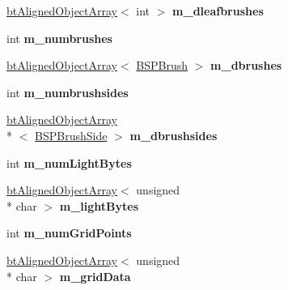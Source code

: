 \begin{DoxyCompactItemize}
\item 
\hypertarget{class_bsp_loader_a443ee94c636f62c62e08bb0eb2f2d7f6}{\hyperlink{classbt_aligned_object_array}{bt\+Aligned\+Object\+Array}$<$ int $>$ {\bfseries m\+\_\+dleafbrushes}}\label{class_bsp_loader_a443ee94c636f62c62e08bb0eb2f2d7f6}

\item 
\hypertarget{class_bsp_loader_a9164fbd68cb9bcd4e98ed4fd91d02ecd}{int {\bfseries m\+\_\+numbrushes}}\label{class_bsp_loader_a9164fbd68cb9bcd4e98ed4fd91d02ecd}

\item 
\hypertarget{class_bsp_loader_a6cfc73b3ff3eba7a197083198b4d998f}{\hyperlink{classbt_aligned_object_array}{bt\+Aligned\+Object\+Array}$<$ \hyperlink{struct_b_s_p_brush}{B\+S\+P\+Brush} $>$ {\bfseries m\+\_\+dbrushes}}\label{class_bsp_loader_a6cfc73b3ff3eba7a197083198b4d998f}

\item 
\hypertarget{class_bsp_loader_a11bf794a15b1a884097097f549b21dd4}{int {\bfseries m\+\_\+numbrushsides}}\label{class_bsp_loader_a11bf794a15b1a884097097f549b21dd4}

\item 
\hypertarget{class_bsp_loader_a5865008f5d8e49368c32f5fc2c9624d9}{\hyperlink{classbt_aligned_object_array}{bt\+Aligned\+Object\+Array}\\*
$<$ \hyperlink{struct_b_s_p_brush_side}{B\+S\+P\+Brush\+Side} $>$ {\bfseries m\+\_\+dbrushsides}}\label{class_bsp_loader_a5865008f5d8e49368c32f5fc2c9624d9}

\item 
\hypertarget{class_bsp_loader_a381f1c6574ad2c03dd7854cea6a8c3be}{int {\bfseries m\+\_\+num\+Light\+Bytes}}\label{class_bsp_loader_a381f1c6574ad2c03dd7854cea6a8c3be}

\item 
\hypertarget{class_bsp_loader_a39b671916a65ade3e97240afa9aef065}{\hyperlink{classbt_aligned_object_array}{bt\+Aligned\+Object\+Array}$<$ unsigned \\*
char $>$ {\bfseries m\+\_\+light\+Bytes}}\label{class_bsp_loader_a39b671916a65ade3e97240afa9aef065}

\item 
\hypertarget{class_bsp_loader_abccaa396d3d29b0b2c1d9883661f0992}{int {\bfseries m\+\_\+num\+Grid\+Points}}\label{class_bsp_loader_abccaa396d3d29b0b2c1d9883661f0992}

\item 
\hypertarget{class_bsp_loader_a6be5e2928fb810dd2190b29e4dbc4abd}{\hyperlink{classbt_aligned_object_array}{bt\+Aligned\+Object\+Array}$<$ unsigned \\*
char $>$ {\bfseries m\+\_\+grid\+Data}}\label{class_bsp_loader_a6be5e2928fb810dd2190b29e4dbc4abd}


\end{DoxyCompactItemize}

